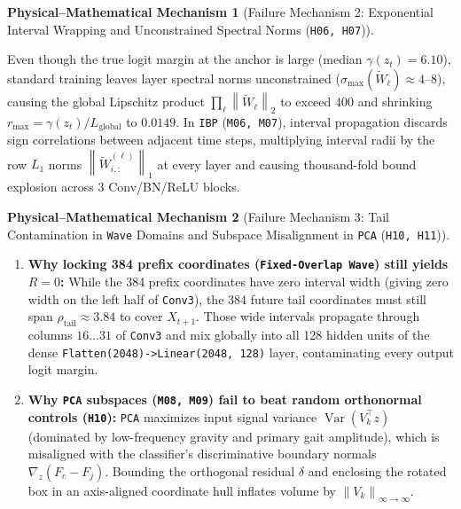\documentclass[11pt,a4paper]{article}
\newcommand{\norm}[1]{\left\lVert #1\right\rVert}
\newcommand{\code}[1]{{\small\ttfamily\nolinkurl{#1}}}
\newtheorem{mechanism}{Physical--Mathematical Mechanism}[section]
\begin{document}
\begin{mechanism}[Failure Mechanism 2: Exponential Interval Wrapping and Unconstrained Spectral Norms (\code{H06, H07})]
\end{mechanism}
Even though the true logit margin at the anchor is large (median $\gamma(z_t) = 6.10$), standard training leaves layer spectral norms unconstrained ($\sigma_{\max}(\widetilde{W}_\ell) \approx 4\text{--}8$), causing the global Lipschitz product $\prod_\ell \norm{\widetilde{W}_\ell}_2$ to exceed $400$ and shrinking $r_{\max} = \gamma(z_t)/L_{\text{global}}$ to $0.0149$. In \code{IBP} (\code{M06, M07}), interval propagation discards sign correlations between adjacent time steps, multiplying interval radii by the row $L_1$ norms $\norm{\widetilde{W}^{(\ell)}_{i,:}}_1$ at every layer and causing thousand-fold bound explosion across 3 Conv/BN/ReLU blocks.

\begin{mechanism}[Failure Mechanism 3: Tail Contamination in \code{Wave} Domains and Subspace Misalignment in \code{PCA} (\code{H10, H11})]
\end{mechanism}
\begin{enumerate}
  \item \textbf{Why locking 384 prefix coordinates (\code{Fixed-Overlap Wave}) still yields $R=0$:} While the 384 prefix coordinates have zero interval width (giving zero width on the left half of \code{Conv3}), the 384 future tail coordinates must still span $\rho_{\text{tail}} \approx 3.84$ to cover $X_{t+1}$. Those wide intervals propagate through columns $16\dots31$ of \code{Conv3} and mix globally into all 128 hidden units of the dense \code{Flatten(2048)->Linear(2048, 128)} layer, contaminating every output logit margin.
  \item \textbf{Why \code{PCA} subspaces (\code{M08, M09}) fail to beat random orthonormal controls (\code{H10}):} \code{PCA} maximizes input signal variance $\operatorname{Var}(V_k^\top z)$ (dominated by low-frequency gravity and primary gait amplitude), which is misaligned with the classifier's discriminative boundary normals $\nabla_z (F_c - F_j)$. Bounding the orthogonal residual $\delta$ and enclosing the rotated box in an axis-aligned coordinate hull inflates volume by $\norm{V_k}_{\infty \to \infty}$.
\end{enumerate}
\end{document}
